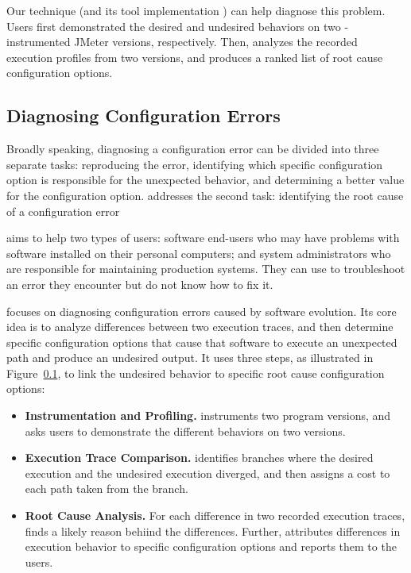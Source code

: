 Our technique (and its tool implementation \ourtool) can help
diagnose this problem. Users first demonstrated the
desired and undesired behaviors on two \ourtool-instrumented
JMeter versions, respectively. Then, \ourtool analyzes the
recorded execution profiles from two versions, and produces
a ranked list of root cause configuration options.


\subsection{Diagnosing Configuration Errors}

Broadly speaking, diagnosing a configuration
error can be divided into three separate tasks:
reproducing the error, identifying which specific
configuration option is responsible for the unexpected
behavior, and determining a better value for the
configuration option. \ourtool addresses
the second task: identifying the root cause of
a configuration error

\ourtool aims to help two types of users: software end-users
who may have problems with software installed on their
personal computers; and system administrators who are
responsible for maintaining production systems.
They can use \ourtool to troubleshoot an
error they encounter but do not know how to fix it. 


\ourtool focuses on diagnosing configuration errors
caused by software evolution. 
Its core idea is to analyze differences between
two execution traces, and then determine specific
configuration options that cause that software
to execute an unexpected path and produce an undesired output.
It uses three steps, as illustrated in Figure~\ref{},  to link the undesired
behavior to specific root cause configuration options:

\begin{itemize}

\item \textbf{Instrumentation and Profiling.} \ourtool
instruments two program versions, and asks users to
demonstrate the different behaviors on two versions.

\item \textbf{Execution Trace Comparison.}
\ourtool identifies branches where the desired execution and
the undesired execution diverged, and then
assigns a cost to each path taken from the branch.

\item \textbf{Root Cause Analysis.} For each difference
in two recorded execution traces, \ourtool finds a likely
reason behiind the differences. Further,
\ourtool attributes differences in execution behavior to
specific configuration options and reports them to the users.


\end{itemize}






